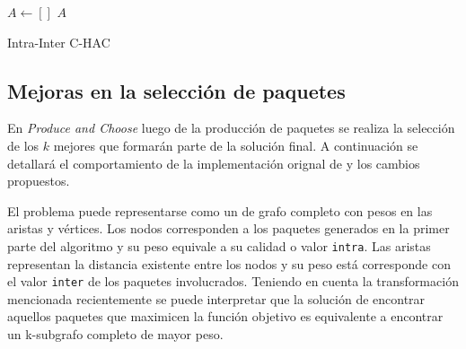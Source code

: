\begin{center}
	\begin{algorithm}[H]
	\DontPrintSemicolon
	\SetAlgoLined
		$A \leftarrow []$\;
		\Return $A$\;
	\caption{Intra-Inter C-HAC}\label{alg:Intra-Inter C-HAC}
	\end{algorithm}
\end{center}

\subsection{Mejoras en la selección de paquetes}
En \emph{Produce and Choose} luego de la producción de paquetes se realiza la selección de los $k$ mejores que formarán parte de la solución final. A continuación se detallará el comportamiento de la implementación orignal de \cite{journals/tkde/Amer-YahiaBCFMZ14} y los cambios propuestos.

El problema puede representarse como un de grafo completo con pesos en las aristas y vértices. Los nodos corresponden a los paquetes generados en la primer parte del algoritmo y su peso equivale a su calidad o valor \texttt{intra}. Las aristas representan la distancia existente entre los nodos y su peso está corresponde con el valor \texttt{inter} de los paquetes involucrados. Teniendo en cuenta la transformación mencionada recientemente se puede interpretar que la solución de encontrar aquellos paquetes que maximicen la función objetivo es equivalente a encontrar un k-subgrafo completo de mayor peso.

